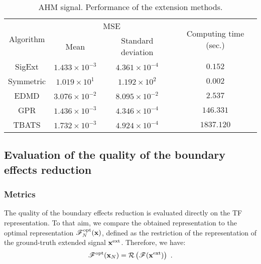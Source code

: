 \begin{table}
\centering
\caption{AHM signal. Performance of the extension methods.}
\begin{tabular}{|c||c|c|c|}
  \hline
   \multirow{2}{*}{Algorithm} & \multicolumn{2}{c|}{MSE}  & \multirow{2}{41pt}{Computing time (sec.)} \\
   \cline{2-3} & Mean & Standard deviation & \\
   \hhline{|=#=|=|=|}
   {\sf SigExt} & $1.433\times 10^{-3}$ & $4.361\times 10^{-4}$ & $0.152$ \\
   \hline
   Symmetric & $1.019\times 10^{1}$ & $1.192\times 10^{2}$ & $0.002$ \\
   \hline
   EDMD & $3.076\times 10^{-2}$ & $8.095\times 10^{-2}$ & $2.537$\\
   \hline
   GPR & $1.436\times 10^{-3}$ & $4.346\times 10^{-4}$ & $146.331$ \\
   \hline
   TBATS & $1.732\times 10^{-3}$ & $4.924\times 10^{-4}$ & $1837.120$ \\
   \hline
\end{tabular}
\label{tab:mse.sine}
\end{table} 


\subsection{Evaluation of the quality of the boundary effects reduction}

\subsubsection{Metrics}
The quality of the boundary effects reduction is evaluated directly on the TF representation. To that aim, we compare the obtained representation to the optimal representation ${\mathscr F}_N^\mathrm{opt}({\mathbf x})$, defined as the restriction of the representation of the ground-truth extended signal ${\mathbf x}^\mathrm{ext}$. Therefore, we have:
\begin{equation}
\ccF^\mathrm{opt}(\bx_N) = \cR\left( \ccF(\bx^\mathrm{ext}) \right) \ .
\label{eq:opt.TFR}
\end{equation} 

